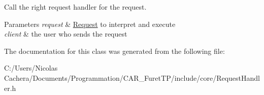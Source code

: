 Call the right request handler for the request. 


\begin{DoxyParams}{Parameters}
{\em request} & \hyperlink{classFTP_1_1Request}{Request} to interpret and execute \\
\hline
{\em client} & the user who sends the request \\
\hline
\end{DoxyParams}


The documentation for this class was generated from the following file\+:\begin{DoxyCompactItemize}
\item 
C\+:/\+Users/\+Nicolas Cachera/\+Documents/\+Programmation/\+C\+A\+R\+\_\+\+Furet\+T\+P/include/core/Request\+Handler.\+h\end{DoxyCompactItemize}
